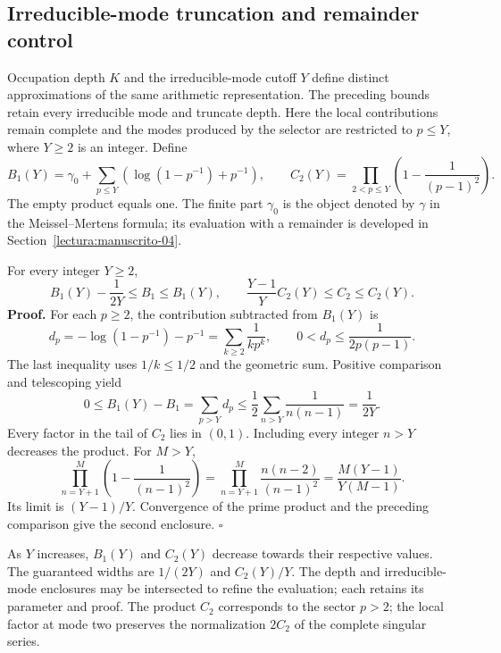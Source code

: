\subsection{Irreducible-mode truncation and remainder control}
\label{ix-add:corte-primos}

Occupation depth $K$ and the irreducible-mode cutoff $Y$ define distinct
approximations of the same arithmetic representation. The preceding bounds
retain every irreducible mode and truncate depth. Here the local contributions
remain complete and the modes produced by the selector are restricted to
$p\leq Y$, where $Y\geq2$ is an integer. Define
\[
 B_1(Y)=\gamma_0+\sum_{p\leq Y}
       \left(\log(1-p^{-1})+p^{-1}\right),\qquad
 C_2(Y)=\prod_{2<p\leq Y}\left(1-\frac1{(p-1)^2}\right).
\]
The empty product equals one. The finite part $\gamma_0$ is the object
denoted by $\gamma$ in the Meissel--Mertens formula; its evaluation with a
remainder is developed in Section~\ref{lectura:manuscrito-04}.

For every integer $Y\geq2$,
\[
 B_1(Y)-\frac1{2Y}\leq B_1\leq B_1(Y),\qquad
 \frac{Y-1}{Y}C_2(Y)\leq C_2\leq C_2(Y).
\]
\textbf{Proof.}
For each $p\geq2$, the contribution subtracted from $B_1(Y)$ is
\[
 d_p=-\log(1-p^{-1})-p^{-1}
     =\sum_{k\geq2}\frac1{kp^k},\qquad
 0<d_p\leq\frac1{2p(p-1)}.
\]
The last inequality uses $1/k\leq1/2$ and the geometric sum.
Positive comparison and telescoping yield
\[
 0\leq B_1(Y)-B_1=\sum_{p>Y}d_p
 \leq\frac12\sum_{n>Y}\frac1{n(n-1)}=\frac1{2Y}.
\]
Every factor in the tail of $C_2$ lies in $(0,1)$. Including every
integer $n>Y$ decreases the product. For $M>Y$,
\[
 \prod_{n=Y+1}^{M}\left(1-\frac1{(n-1)^2}\right)
 =\prod_{n=Y+1}^{M}\frac{n(n-2)}{(n-1)^2}
 =\frac{M(Y-1)}{Y(M-1)}.
\]
Its limit is $(Y-1)/Y$. Convergence of the prime product and the
preceding comparison give the second enclosure. \hfill$\square$

As $Y$ increases, $B_1(Y)$ and $C_2(Y)$ decrease towards their respective
values. The guaranteed widths are $1/(2Y)$ and $C_2(Y)/Y$. The depth and
irreducible-mode enclosures may be intersected to refine the evaluation;
each retains its parameter and proof. The product $C_2$ corresponds to
the sector $p>2$; the local factor at mode two preserves the normalization
$2C_2$ of the complete singular series.
